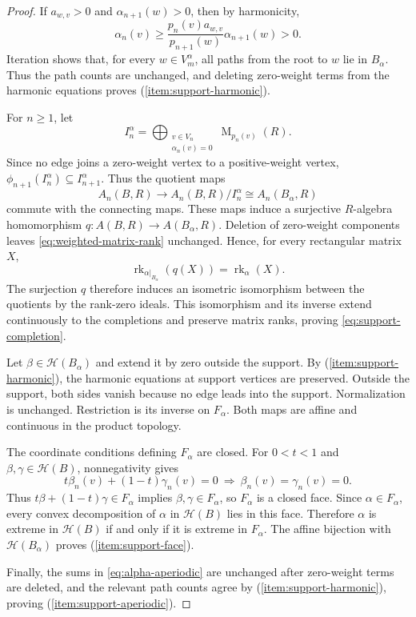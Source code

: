 \documentclass[11pt]{amsart}
\DeclareMathOperator{\rk}{rk}
\DeclareMathOperator{\Mat}{M}
\theoremstyle{definition}
\theoremstyle{remark}
\begin{document}
\begin{proof}
  If \(a_{w,v}>0\) and \(\alpha_{n+1}(w)>0\), then by harmonicity,
\[
 \alpha_n(v)\geq
 \frac{p_n(v)a_{w,v}}{p_{n+1}(w)}\alpha_{n+1}(w)>0.
\]
Iteration shows that, for every $w\in V_m^\alpha$, all paths from
the root to $w$ lie in $B_\alpha$.
Thus the path counts are unchanged, and deleting zero-weight terms
from the harmonic equations proves (\ref{item:support-harmonic}).

\medskip
For $n\geq1$, let
\[
 I_n^\alpha=
 \bigoplus_{\substack{v\in V_n\\\alpha_n(v)=0}}\Mat_{p_n(v)}(R).
\]
Since no edge joins a zero-weight vertex to a positive-weight vertex,
$\phi_{n+1}(I_n^\alpha)\subseteq I_{n+1}^\alpha$.
Thus the quotient maps
\[
 A_n(B,R)\longrightarrow A_n(B,R)/I_n^\alpha
 \cong A_n(B_\alpha,R)
\]
commute with the connecting maps.
These maps induce a surjective $R$-algebra homomorphism
$q\colon A(B,R)\to A(B_\alpha,R)$.
Deletion of zero-weight components leaves
\eqref{eq:weighted-matrix-rank} unchanged.
Hence, for every rectangular matrix $X$,
\[
 \rk_{\alpha|_{B_\alpha}}(q(X))=\rk_\alpha(X).
\]
The surjection $q$ therefore induces an isometric isomorphism between the
quotients by the rank-zero ideals.
This isomorphism and its inverse extend continuously to the completions and
preserve matrix ranks, proving \eqref{eq:support-completion}.

\medskip
Let $\beta\in\mathcal H(B_\alpha)$ and extend it by zero outside the support.
By (\ref{item:support-harmonic}), the harmonic equations at support
vertices are preserved.  Outside the support, both sides vanish
because no edge leads into the support.  Normalization is unchanged.
Restriction is its inverse on $F_\alpha$.
Both maps are affine and continuous in the product topology.

The coordinate conditions defining $F_\alpha$ are closed.
For $0<t<1$ and $\beta,\gamma\in\mathcal H(B)$, nonnegativity gives
\[
 t\beta_n(v)+(1-t)\gamma_n(v)=0
 \ \Longrightarrow\ \beta_n(v)=\gamma_n(v)=0.
\]
Thus $t\beta+(1-t)\gamma\in F_\alpha$ implies
$\beta,\gamma\in F_\alpha$, so $F_\alpha$ is a closed face.
Since $\alpha\in F_\alpha$, every convex decomposition of $\alpha$ in
$\mathcal H(B)$ lies in this face.  Therefore $\alpha$ is extreme in $\mathcal H(B)$
if and only if it is extreme in $F_\alpha$.  The affine bijection with
$\mathcal H(B_\alpha)$ proves (\ref{item:support-face}).

\medskip
Finally, the sums in \eqref{eq:alpha-aperiodic} are unchanged after zero-weight
terms are deleted, and the relevant path counts agree by (\ref{item:support-harmonic}), proving (\ref{item:support-aperiodic}).
\end{proof}
\end{document}
